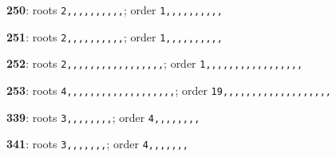 \noindent \textbf{250}: roots \texttt{2,,,,,,,,,,}; order \texttt{1,,,,,,,,,,}\par
\noindent \textbf{251}: roots \texttt{2,,,,,,,,,,}; order \texttt{1,,,,,,,,,,}\par
\noindent \textbf{252}: roots \texttt{2,,,,,,,,,,,,,,,,,}; order \texttt{1,,,,,,,,,,,,,,,,,}\par
\noindent \textbf{253}: roots \texttt{4,,,,,,,,,,,,,,,,,,,}; order \texttt{19,,,,,,,,,,,,,,,,,,,}\par
\noindent \textbf{339}: roots \texttt{3,,,,,,,,}; order \texttt{4,,,,,,,,}\par
\noindent \textbf{341}: roots \texttt{3,,,,,,,}; order \texttt{4,,,,,,,}\par
